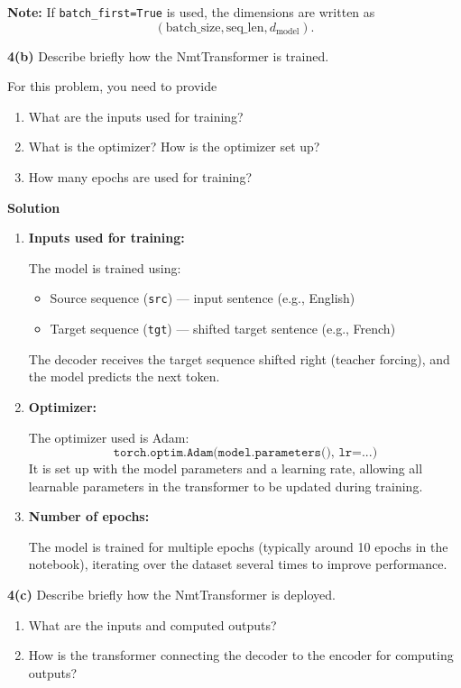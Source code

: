 \documentclass[10pt]{article}
\begin{document}
\textbf{Note:} If \texttt{batch\_first=True} is used, the dimensions are written as
\[
(\text{batch\_size}, \text{seq\_len}, d_{\text{model}}).
\]

\textbf{4(b)} Describe briefly how the NmtTransformer is trained.

For this problem, you need to provide

\begin{enumerate}[label=\alph*.]
    \item What are the inputs used for training?
    \item What is the optimizer? How is the optimizer set up?
    \item How many epochs are used for training?
\end{enumerate}

\textbf{Solution}

\begin{enumerate}[label=\alph*.]

\item \textbf{Inputs used for training:}

The model is trained using:
\begin{itemize}
    \item Source sequence (\texttt{src}) — input sentence (e.g., English)
    \item Target sequence (\texttt{tgt}) — shifted target sentence (e.g., French)
\end{itemize}
The decoder receives the target sequence shifted right (teacher forcing), and the model predicts the next token.

\item \textbf{Optimizer:}

The optimizer used is Adam:
\[
\texttt{torch.optim.Adam(model.parameters(), lr=...)}
\]
It is set up with the model parameters and a learning rate, allowing all learnable parameters in the transformer to be updated during training.

\item \textbf{Number of epochs:}

The model is trained for multiple epochs (typically around 10 epochs in the notebook), iterating over the dataset several times to improve performance.

\end{enumerate}

\textbf{4(c)} Describe briefly how the NmtTransformer is deployed.

\begin{enumerate}[label=\alph*.]
    \item What are the inputs and computed outputs?
    \item How is the transformer connecting the decoder to the encoder for computing outputs?
\end{enumerate}
\end{document}
